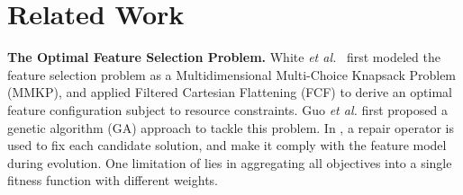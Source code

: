 \section{Related Work}\label{sec:related}

\noindent\textbf{The Optimal Feature Selection Problem.}
White \emph{et al.}~\cite{DBLP:journals/jss/WhiteDS09} first modeled the feature selection problem as a Multidimensional Multi-Choice Knapsack Problem (MMKP), and applied Filtered Cartesian Flattening (FCF) to derive an optimal feature configuration subject to resource constraints.
Guo \emph{et al.}  \cite{DBLP:journals/jss/GuoWWLW11} first proposed a genetic algorithm (GA) approach to tackle this problem. In \cite{DBLP:journals/jss/GuoWWLW11}, a repair operator is used to fix each candidate solution, and make it comply with the feature model during evolution. %
One limitation of \cite{DBLP:journals/jss/GuoWWLW11} lies in aggregating all objectives into a single fitness function with different weights. %


